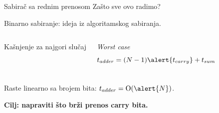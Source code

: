 \begin{frame}[label=05-s017]{Sabirač sa rednim prenosom}
\alert{Zašto sve ovo radimo?}\par
Binarno sabiranje: ideja iz algoritamskog sabiranja.
\begin{center}\end{center}
\begin{columns}[c,onlytextwidth]
Kašnjenje za najgori slučaj\par\textit{Worst case}
\[t_{adder}=(N-1)\alert{t_{carry}}+t_{sum}\]
\end{columns}
\par\smallskip Raste linearno sa brojem bita: $t_{adder}=\mathrm{O}(\alert{N})$.\par\smallskip
\textbf{Cilj: napraviti što brži prenos carry bita.}
\end{frame}
